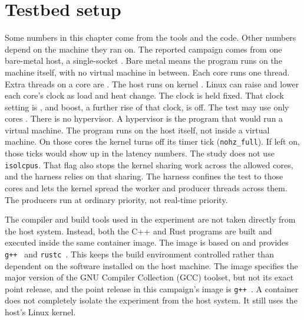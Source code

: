 \documentclass[english,oneside,a4paper,censored,csm,software-track-2020]{HYthesisML}
\begin{document}
\section{Testbed setup\label{sec:testbed}}
Some numbers in this chapter come from the tools and the code. Other
numbers depend on the machine they ran on. The reported campaign comes from
one bare-metal host, a single-socket \MainCpu{}. Bare metal means the program runs on the machine itself,
with no virtual machine in between. Each core runs one
thread. Extra threads on a core are \MainSmt{}. The host runs
\MainHostDistro{} on kernel \MainKernel{}. Linux can raise and
lower each core's clock as load and heat change. The clock is held
fixed. That clock setting is \MainGovernor{}, and boost, a further rise of that clock, is off. The
test may use only cores \MainPinned{}. There is no hypervisor. A hypervisor
is the program that would run a virtual machine. The
program runs on the host itself, not inside a virtual machine. On those
cores the kernel turns off its timer tick (\texttt{nohz\_full}).
If left on, those ticks would show up in the latency numbers. The study does
not use \texttt{isolcpus}. That flag also stops the kernel sharing work
across the allowed cores, and the harness relies on that sharing. The harness
confines the test to those cores and lets the kernel spread the worker and
producer threads across them. The producers run at ordinary priority, not
real-time priority.

The compiler and build tools used in the experiment are not taken directly
from the host system. Instead, both the C++ and Rust programs are built and
executed inside the same container image. The image is based on \MainDistro{}
and provides \texttt{g++~\MainGpp} and \texttt{rustc~\MainRustc}. This
keeps the build environment controlled rather than dependent on the
software installed on the host machine. The image specifies the major
version of the GNU Compiler Collection (GCC) toolset, but not its exact point release, and
the point release in this campaign's image is \texttt{g++~\MainGpp}. A container
does not completely isolate the experiment from the host system. It still uses the host's
Linux kernel.
\end{document}
